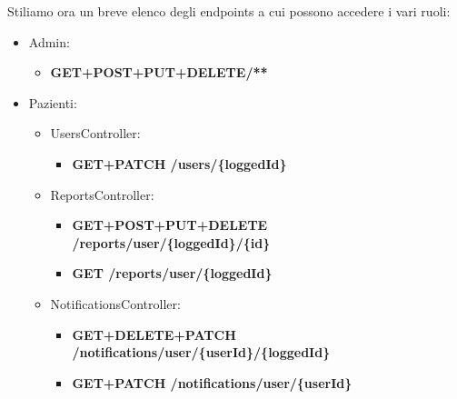 \documentclass[a4paper]{article}
\begin{document}
Stiliamo ora un breve elenco degli endpoints a cui possono accedere i vari ruoli:
\begin{itemize}
  \item Admin:
  \begin{itemize}
    \item \textbf{GET+POST+PUT+DELETE/**}
  \end{itemize}

  \item Pazienti:
  \begin{itemize}
    \item UsersController: 
    \begin{itemize}
      \item \textbf{GET+PATCH /users/\{loggedId\}}
    \end{itemize}
    \item ReportsController: \begin{itemize}
      \item \textbf{GET+POST+PUT+DELETE /reports/user/\{loggedId\}/\{id\}}
      \item \textbf{GET /reports/user/\{loggedId\}}
    \end{itemize}
    \item NotificationsController: 
    \begin{itemize}
      \item \textbf{GET+DELETE+PATCH /notifications/user/\{userId\}/\{loggedId\}}
      \item \textbf{GET+PATCH /notifications/user/\{userId\}}
    \end{itemize}
  \end{itemize}


\end{itemize}
\end{document}
